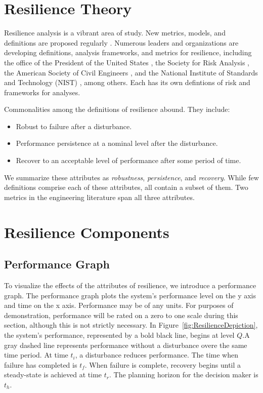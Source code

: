 \section{Resilience Theory}
Resilience analysis is a vibrant area of study. New metrics, models,
and definitions are proposed regularly \cite{Righi2015,
  Hosseini2016}. Numerous leaders and organizations are developing
definitions, analysis frameworks, and metrics for resilience,
including the office of the President of the United States
\cite{PPD21}, the Society for Risk Analysis \cite{Aven2015b}, the
American Society of Civil Engineers \cite{IRD2016}, and the National
Institute of Standards and Technology (NIST) \cite{CRP2016}, among
others. Each has its own defintions of risk and frameworks for
analyses.

Commonalities among the definitions of resilience abound. They
include:
\begin{itemize}
  \item Robust to failure after a disturbance.
  \item Performance persistence at a nominal level after the
    disturbance.
  \item Recover to an acceptable level of performance after some
    period of time.
\end{itemize}
We summarize these attributes as \emph{robustness},
\emph{persistence}, and \emph{recovery}. While few definitions
comprise each of these attributes, all contain a subset of them. Two
metrics \cite{Ayyub2014a, Ayyub2015, Ouyang2012, Ouyang2015, Aven2015b} in the
engineering literature span all three attributes.

\section{Resilience Components}
\subsection{Performance Graph}
To visualize the effects of the attributes of resilience, we introduce
a performance graph. The performance graph plots the system's
performance level on the y axis and time on the x axis. Performance
may be of any units. For purposes of demonstration, performance will
be rated on a zero to one scale during this section, although this is
not strictly necessary. In Figure~\ref{fig:ResilienceDepiction}, the
system's performance, represented by a bold black line, begins at
level $Q$.A gray dashed line represents performance without a
disturbance overe the same time period. At time $t_i$, a disturbance
reduces performance. The time when failure has completed is
$t_f$. When failure is complete, recovery begins until a steady-state
is achieved at time $t_r$. The planning horizon for the decision maker
is $t_h$.

